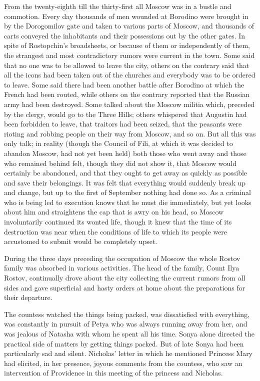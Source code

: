 From the twenty-eighth till the thirty-first all Moscow was in a
bustle and commotion. Every day thousands of men wounded at
Borodino were brought in by the Dorogomilov gate and taken to
various parts of Moscow, and thousands of carts conveyed the
inhabitants and their possessions out by the other gates. In
spite of Rostopchin's broadsheets, or because of them or
independently of them, the strangest and most contradictory
rumors were current in the town. Some said that no one was to be
allowed to leave the city, others on the contrary said that all
the icons had been taken out of the churches and everybody was to
be ordered to leave.  Some said there had been another battle
after Borodino at which the French had been routed, while others
on the contrary reported that the Russian army had been
destroyed. Some talked about the Moscow militia which, preceded
by the clergy, would go to the Three Hills; others whispered that
Augustin had been forbidden to leave, that traitors had been
seized, that the peasants were rioting and robbing people on
their way from Moscow, and so on. But all this was only talk; in
reality (though the Council of Fili, at which it was decided to
abandon Moscow, had not yet been held) both those who went away
and those who remained behind felt, though they did not show it,
that Moscow would certainly be abandoned, and that they ought to
get away as quickly as possible and save their belongings. It was
felt that everything would suddenly break up and change, but up
to the first of September nothing had done so. As a criminal who
is being led to execution knows that he must die immediately, but
yet looks about him and straightens the cap that is awry on his
head, so Moscow involuntarily continued its wonted life, though
it knew that the time of its destruction was near when the
conditions of life to which its people were accustomed to submit
would be completely upset.

During the three days preceding the occupation of Moscow the
whole Rostov family was absorbed in various activities. The head
of the family, Count Ilya Rostov, continually drove about the
city collecting the current rumors from all sides and gave
superficial and hasty orders at home about the preparations for
their departure.

The countess watched the things being packed, was dissatisfied
with everything, was constantly in pursuit of Petya who was
always running away from her, and was jealous of Natasha with
whom he spent all his time. Sonya alone directed the practical
side of matters by getting things packed. But of late Sonya had
been particularly sad and silent.  Nicholas' letter in which he
mentioned Princess Mary had elicited, in her presence, joyous
comments from the countess, who saw an intervention of Providence
in this meeting of the princess and Nicholas.

